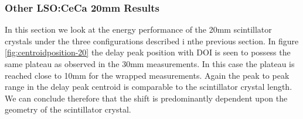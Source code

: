 \subsubsection{Other LSO:CeCa 20mm Results}
In this section we look at the energy performance of the 20mm scintillator crystals under the three configurations described i nthe previous section. In figure \ref{fig:centroidposition-20} the delay peak position with DOI is seen to possess the same plateau as observed in the 30mm measurements. In this case the plateau is reached close to 10mm for the wrapped measurements. Again the peak to peak range in the delay peak centroid is comparable to the scintillator crystal length. We can conclude therefore that the shift is predominantly dependent upon the geometry of the scintillator crystal. 